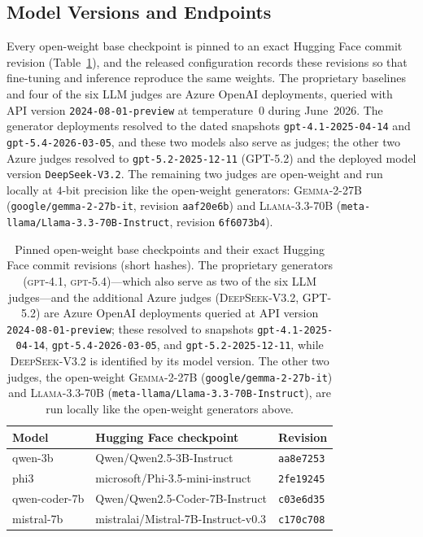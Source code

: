 \documentclass[letterpaper]{article}
\begin{document}
\subsection{Model Versions and Endpoints}
{\sloppy\setlength{\emergencystretch}{3em}
Every open-weight base checkpoint is pinned to an exact Hugging Face commit revision (Table~\ref{tab:modelversions}), and the released configuration records these revisions so that fine-tuning and inference reproduce the same weights. The proprietary baselines and four of the six LLM judges are Azure OpenAI deployments, queried with API version \texttt{2024-08-01-preview} at temperature~$0$ during June~2026. The generator deployments resolved to the dated snapshots \texttt{gpt-4.1-2025-04-14} and \texttt{gpt-5.4-2026-03-05}, and these two models also serve as judges; the other two Azure judges resolved to \texttt{gpt-5.2-2025-12-11} (\textsc{GPT-5.2}) and the deployed model version \texttt{DeepSeek-V3.2}. The remaining two judges are open-weight and run locally at $4$-bit precision like the open-weight generators: \textsc{Gemma-2-27B} (\texttt{google/gemma-2-27b-it}, revision \texttt{aaf20e6b}) and \textsc{Llama-3.3-70B} (\texttt{meta-llama/Llama-3.3-70B-Instruct}, revision \texttt{6f6073b4}).\par}

\begin{table}[h]
\centering
\small
\begin{tabular}{@{}lll@{}}
\toprule
\textbf{Model} & \textbf{Hugging Face checkpoint} & \textbf{Revision} \\
\midrule
qwen-3b       & Qwen/Qwen2.5-3B-Instruct           & \texttt{aa8e7253} \\
phi3          & microsoft/Phi-3.5-mini-instruct    & \texttt{2fe19245} \\
qwen-coder-7b & Qwen/Qwen2.5-Coder-7B-Instruct     & \texttt{c03e6d35} \\
mistral-7b    & mistralai/Mistral-7B-Instruct-v0.3 & \texttt{c170c708} \\
\bottomrule
\end{tabular}
\caption{Pinned open-weight base checkpoints and their exact Hugging Face commit revisions (short hashes). The proprietary generators (\textsc{gpt-4.1}, \textsc{gpt-5.4})---which also serve as two of the six LLM judges---and the additional Azure judges (\textsc{DeepSeek-V3.2}, \textsc{GPT-5.2}) are Azure OpenAI deployments queried at API version \texttt{2024-08-01-preview}; these resolved to snapshots \texttt{gpt-4.1-2025-04-14}, \texttt{gpt-5.4-2026-03-05}, and \texttt{gpt-5.2-2025-12-11}, while \textsc{DeepSeek-V3.2} is identified by its model version. The other two judges, the open-weight \textsc{Gemma-2-27B} (\texttt{google/gemma-2-27b-it}) and \textsc{Llama-3.3-70B} (\texttt{meta-llama/Llama-3.3-70B-Instruct}), are run locally like the open-weight generators above.}
\label{tab:modelversions}
\end{table}
\end{document}

